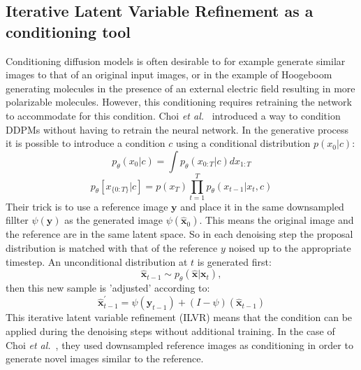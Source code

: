 \documentclass[journal=jacsat,manuscript=article]{achemso}
\begin{document}
\subsection{Iterative Latent Variable Refinement as a conditioning tool}
Conditioning diffusion models is often desirable to for example generate similar images to that of an original input images, or in the example of Hoogeboom generating molecules in the presence of an external electric field resulting in more polarizable molecules. However, this conditioning requires retraining the network to accommodate for this condition. Choi \textit{et al.}~\cite{choi2021ilvr} introduced a way to condition DDPMs without having to retrain the neural network. In the generative process it is possible to introduce a condition $c$ using a conditional distribution $p(x_0|c)$:
\begin{equation}
    p_\theta(x_0|c) = \int p_\theta(x_{0:T}|c)dx_{1:T}
\end{equation}
\begin{equation}
    p_{\theta}[x_{\{0:T\}}|c]=p(x_T)\prod_{t=1}^{T}p_{\theta}(x_{t-1}|x_t,c)
\end{equation}
Their trick is to use a reference image $\mathbf{y}$ and place it in the same downsampled fillter $\psi(\mathbf{y})$ as the generated image $\psi(\mathbf{\hat{x}}_0)$. This means the original image and the reference are  in the same latent space. So in each denoising step the proposal distribution is matched with that of the reference $y$ noised up to the appropriate timestep. An unconditional distribution at $t$ is generated first:
\begin{equation}
\mathbf{\hat{x}}_{t-1} \sim p_{\theta}( \mathbf{\hat{x}}|\mathbf{x}_t),
\end{equation}
then this  new sample is 'adjusted' according to:
\begin{equation}
    \mathbf{\hat{x}}^{\prime}_{t-1} = \psi(\mathbf{y}_{t-1}) + (I-\psi)(\mathbf{\hat{x}}_{t-1})
\end{equation}
This iterative latent variable refinement (ILVR) means that the condition can be applied during the denoising steps without additional training. In the case of Choi \textit{et al.}~\cite{choi2021ilvr}, they used downsampled reference images as conditioning in order to generate novel images similar to the reference. 

\end{document}
